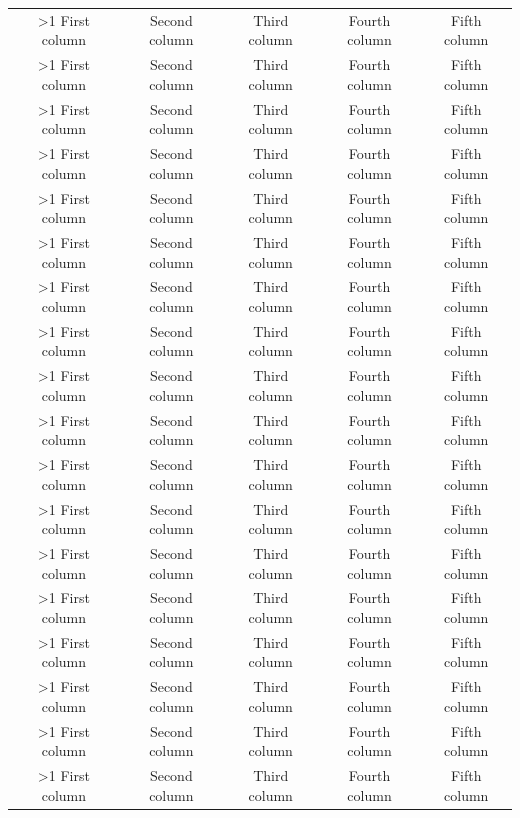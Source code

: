 \documentclass{article}
\begin{document}
\newcommand{\SetRowColor}{%
   \noalign{\stepcounter{RowNum}}\ifnum\value{RowNum}>1\rowcolor[gray]{0.8}\fi%
   \noalign{\ifnum\value{RowNum}=2\setcounter{RowNum}{0}\fi}}

\begin{longtable}{|c|c|c|c|c|}
  \hline
  \SetRowColor First column & Second column & Third column & Fourth column & Fifth column \\
  \SetRowColor First column & Second column & Third column & Fourth column & Fifth column \\
  \SetRowColor First column & Second column & Third column & Fourth column & Fifth column \\
  \SetRowColor First column & Second column & Third column & Fourth column & Fifth column \\
  \SetRowColor First column & Second column & Third column & Fourth column & Fifth column \\
  \SetRowColor First column & Second column & Third column & Fourth column & Fifth column \\
  \SetRowColor First column & Second column & Third column & Fourth column & Fifth column \\
  \SetRowColor First column & Second column & Third column & Fourth column & Fifth column \\
  \SetRowColor First column & Second column & Third column & Fourth column & Fifth column \\
  \SetRowColor First column & Second column & Third column & Fourth column & Fifth column \\
  \SetRowColor First column & Second column & Third column & Fourth column & Fifth column \\
  \SetRowColor First column & Second column & Third column & Fourth column & Fifth column \\
  \SetRowColor First column & Second column & Third column & Fourth column & Fifth column \\
  \SetRowColor First column & Second column & Third column & Fourth column & Fifth column \\
  \SetRowColor First column & Second column & Third column & Fourth column & Fifth column \\
  \SetRowColor First column & Second column & Third column & Fourth column & Fifth column \\
  \SetRowColor First column & Second column & Third column & Fourth column & Fifth column \\
  \SetRowColor First column & Second column & Third column & Fourth column & Fifth column \\
  \hline
\end{longtable}
\end{document}
